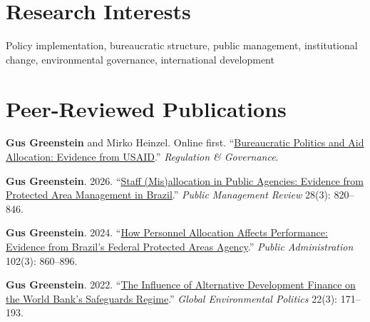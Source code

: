 \documentclass[11pt, letterpaper]{article}
\begin{document}
\section{Research Interests}

Policy implementation, bureaucratic structure, public management, institutional change, environmental governance, international development

\section{Peer-Reviewed Publications}

\textbf{Gus Greenstein} and Mirko Heinzel. Online first. ``\href{https://onlinelibrary.wiley.com/doi/10.1111/rego.70106?af=R}{Bureaucratic Politics and Aid Allocation: Evidence from USAID}.'' \textit{Regulation \& Governance}.

\vspace{0.5em}

\textbf{Gus Greenstein}. 2026. ``\href{https://www.tandfonline.com/doi/full/10.1080/14719037.2025.2478621}{Staff (Mis)allocation in Public Agencies: Evidence from Protected Area Management in Brazil}.'' \textit{Public Management Review} 28(3): 820--846.

\vspace{0.2em}
\hspace{1em}{\small ISA Environmental Studies Section Graduate Student Paper Award, 2023}

\vspace{0.5em}

\textbf{Gus Greenstein}. 2024. ``\href{https://onlinelibrary.wiley.com/doi/full/10.1111/padm.12954}{How Personnel Allocation Affects Performance: Evidence from Brazil's Federal Protected Areas Agency}.'' \textit{Public Administration} 102(3): 860--896.

\vspace{0.2em}

\vspace{0.5em}

\textbf{Gus Greenstein}. 2022. ``\href{https://www.gusgreenstein.com/uploads/1/3/7/2/137261035/2022_--_greenstein_--_global_environmental_politics_--_the_influence_of_alternative_development_finance_on_the_world_banks_safeguards_regime.pdf}{The Influence of Alternative Development Finance on the World Bank's Safeguards Regime}.'' \textit{Global Environmental Politics} 22(3): 171--193.
\end{document}
